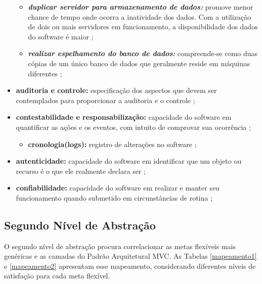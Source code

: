 \begin{itemize}
\begin{itemize}
	 		\item \textbf{\textit{duplicar servidor para armazenamento de dados:}} promove menor chance de tempo onde ocorra a inatividade dos dados. Com a utilização de dois ou mais servidores em funcionamento, a disponibilidade dos dados do software é maior \cite{date2004introduccao}\cite{affleck2012supporting};   
	 		
	 		\item \textbf{\textit{realizar espelhamento do banco de dados:}} compreende-se como duas cópias de um único banco de dados que geralmente reside em máquinas diferentes \cite{date2004introduccao}\cite{affleck2012supporting}; 
	 		
	 \end{itemize}
 
 	\item \textbf{auditoria e controle:} especificação dos aspectos que devem ser contemplados para proporcionar a auditoria e o controle \cite{benitti2015taxonomia}; 
 	
 	\item  \textbf{contestabilidade e responsabilização:} capacidade do software em quantificar as ações e os eventos, com intuito de comprovar sua ocorrência \cite{benitti2015taxonomia}; 
 	
 	\begin{itemize}
 		
 		\item \textbf{cronologia(logs):} registro de alterações no software \cite{benitti2015taxonomia};
 		
 	\end{itemize}
 	
 	\item \textbf{autenticidade:} capacidade do software em identificar que um objeto ou recurso é o que ele realmente declara ser \cite{benitti2015taxonomia}; 
 	
 	\item \textbf{confiabilidade:} capacidade do software em realizar e manter seu funcionamento quando submetido em circunstâncias de rotina \cite{benitti2015taxonomia}; 
 	
\end{itemize}

\subsection{Segundo Nível de Abstração}
\label{sub:segundoNivel}

O segundo nível de abstração procura correlacionar as metas flexíveis mais genéricas e as camadas do Padrão Arquitetural MVC. As Tabelas \ref{mapeamento1} e \ref{mapeamento2} apresentam esse mapeamento, considerando diferentes níveis de satisfação para cada meta flexível.


